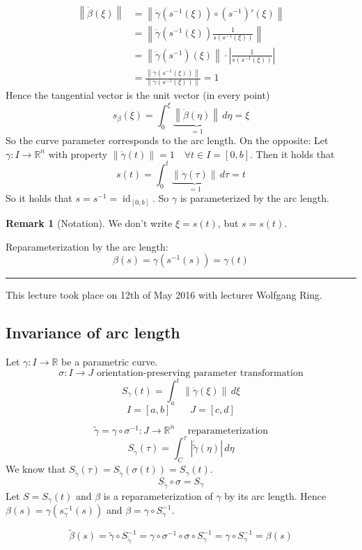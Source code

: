 \documentclass[a4paper,landscape,twocolumn]{article}
\theoremstyle{definition}
\newtheorem{rem}{Remark}
\newcommand\abs[1]{\left|#1\right|}
\newcommand\meta[3]{\hrule{} This #1 took place on #2 with lecturer #3.\par}
\newcommand\norm[1]{\left\|#1\right\|}
\begin{document}
\begin{align*}
  \norm{\dot\beta(\xi)}
    &= \norm{\dot\gamma(s^{-1}(\xi)) \circ (s^{-1})'(\xi)} \\
    &= \norm{\dot\gamma(s^{-1}(\xi)) \frac{1}{\dot{s}(s^{-1}(\xi))}} \\
    &= \norm{\dot\gamma(s^{-1})(\xi)} \cdot \abs{\frac{1}{\dot{s} (s^{-1}(\xi))}} \\
    &= \frac{\norm{\dot{\gamma}(s^{-1}(\xi))}}{\norm{\dot\gamma(s^{-1}(\xi))}} = 1
\end{align*}
Hence the tangential vector is the unit vector (in every point)
\[ s_{\beta}(\xi) = \int_0^{\xi} \underbrace{\norm{\dot\beta(\eta)}}_{=1} \, d\eta = \xi \]
So the curve parameter corresponds to the arc length.
On the opposite: Let $\gamma: I \to \mathbb R^n$ with property $\norm{\dot\gamma(t)} = 1 \quad\forall t \in I = [0,b]$.
Then it holds that
\[ s(t) = \int_0^t \underbrace{\norm{\dot\gamma(\tau)}}_{=1} \, d\tau = t \]
So it holds that $s = s^{-1} = \operatorname{id}_{[0,b]}$.
So $\gamma$ is parameterized by the arc length.

\begin{rem}[Notation]
  We don't write $\xi = s(t)$, but $s = s(t)$.
\end{rem}

Reparameterization by the arc length:
\[ \beta(s) = \gamma(s^{-1}(s)) = \gamma(t) \]

\meta{lecture}{12th of May 2016}{Wolfgang Ring}

\subsection{Invariance of arc length}
%
Let $\gamma: I \to \mathbb R$ be a parametric curve.
\[ \sigma: I \to J \text{ orientation-preserving parameter transformation} \]
\[ S_\gamma(t) = \int_a^t \norm{\dot\gamma(\xi)} \, d\xi \]
\[ I = [a,b] \qquad J = [c,d] \]

\[ \tilde{\gamma} = \gamma \circ \sigma^{-1}: J \to \mathbb R^n \quad \text{ reparameterization} \]
\[ S_{\tilde{\gamma}}(\tau) = \int_C^\tau \abs{\dot{\tilde{\gamma}}(\eta)} \, d\eta \]
We know that $S_{\tilde{\gamma}}(\tau) = S_{\tilde{\gamma}}(\sigma(t)) = S_{\gamma}(t)$.
\[ S_{\tilde{\gamma}} \circ \sigma = S_{\gamma} \]
Let $S = S_{\gamma}(t)$ and $\beta$ is a reparameterization of $\gamma$ by its arc length.
Hence $\beta(s) = \gamma(s^{-1}_\gamma(s))$ and $\beta = \gamma \circ S_{\gamma}^{-1}$.

\[ \tilde{\beta}(s) = \tilde{\gamma} \circ S_{\tilde{\gamma}}^{-1} = \gamma \circ \sigma^{-1} \circ \sigma \circ S_{\gamma}^{-1} = \gamma \circ S_{\gamma}^{-1} = \beta(s) \]
\end{document}
